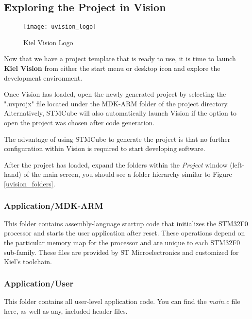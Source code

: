 \documentclass[11pt,fleqn]{book} %
\begin{document}
\subsection{Exploring the Project in {\textmu}Vision}

    \begin{wrapfigure}[8]{h!R}{0.2\textwidth}
    \centering\texttt{[image: uvision\_logo]}
    \caption{Kiel {\textmu}Vision Logo}
    \label{uvision_logo}
    \end{wrapfigure}

Now that we have a project template that is ready to use, it is time to launch \textbf{Kiel {\textmu}Vision} from either the start menu or desktop icon and explore the development environment. 

Once {\textmu}Vision has loaded, open the newly generated project by selecting the ".uvprojx" file located under the MDK-ARM folder of the project directory. Alternatively, STMCube will also automatically launch {\textmu}Vision if the option to open the project was chosen after code generation. 

The advantage of using STMCube to generate the project is that no further configuration within {\textmu}Vision is required to start developing software. 

After the project has loaded, expand the folders within the \textit{Project} window (left-hand) of the main screen, you should see a folder hierarchy similar to Figure \ref{uvision_folders}.

\subsubsection*{Application/MDK-ARM}
This folder contains assembly-language startup code that initializes the STM32F0 processor and starts the user application after reset.  These operations depend on the particular memory map for the processor and are unique to each STM32F0 sub-family. These files are provided by ST Microelectronics and customized for Kiel's toolchain. 

\subsubsection*{Application/User}
This folder contains all user-level application code. You can find the \textit{main.c} file here, as well as any, included header files. 
\end{document}
